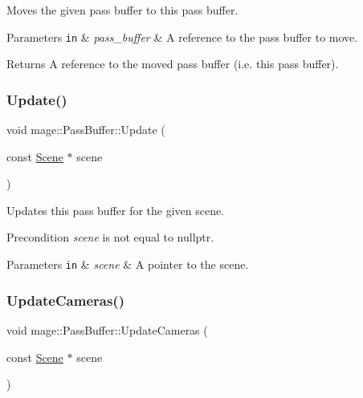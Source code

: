 Moves the given pass buffer to this pass buffer.


\begin{DoxyParams}[1]{Parameters}
\mbox{\tt in}  & {\em pass\+\_\+buffer} & A reference to the pass buffer to move. \\
\hline
\end{DoxyParams}
\begin{DoxyReturn}{Returns}
A reference to the moved pass buffer (i.\+e. this pass buffer). 
\end{DoxyReturn}
\hypertarget{structmage_1_1_pass_buffer_a6b73eb28fac15b121ff013b03ab643f8}{}\label{structmage_1_1_pass_buffer_a6b73eb28fac15b121ff013b03ab643f8} 
\subsubsection{\texorpdfstring{Update()}{Update()}}
{\footnotesize\ttfamily void mage\+::\+Pass\+Buffer\+::\+Update (\begin{DoxyParamCaption}\item[{const \hyperlink{classmage_1_1_scene}{Scene} $\ast$}]{scene }\end{DoxyParamCaption})}

Updates this pass buffer for the given scene.

\begin{DoxyPrecond}{Precondition}
{\itshape scene} is not equal to {\ttfamily nullptr}. 
\end{DoxyPrecond}

\begin{DoxyParams}[1]{Parameters}
\mbox{\tt in}  & {\em scene} & A pointer to the scene. \\
\hline
\end{DoxyParams}
\hypertarget{structmage_1_1_pass_buffer_a1ded2ce7cadbcb176aec69a85ba81c3e}{}\label{structmage_1_1_pass_buffer_a1ded2ce7cadbcb176aec69a85ba81c3e} 
\subsubsection{\texorpdfstring{Update\+Cameras()}{UpdateCameras()}}
{\footnotesize\ttfamily void mage\+::\+Pass\+Buffer\+::\+Update\+Cameras (\begin{DoxyParamCaption}\item[{const \hyperlink{classmage_1_1_scene}{Scene} $\ast$}]{scene }\end{DoxyParamCaption})\hspace{0.3cm}{\ttfamily [private]}}

